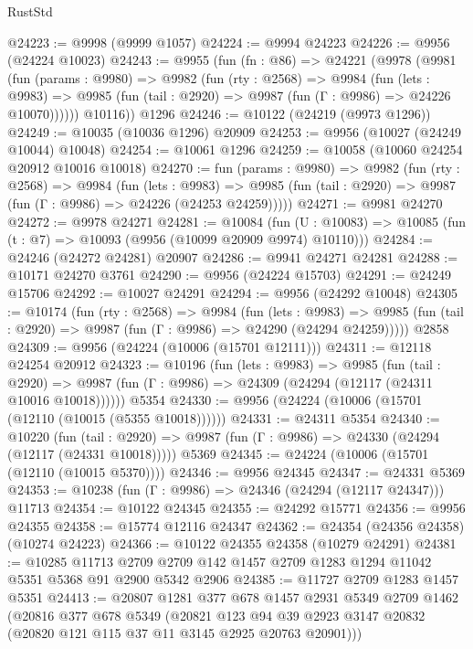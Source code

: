 \begin{lexlean}{RustStd}
\begin{coremodule}
@24223 := @9998 (@9999 @1057)
@24224 := @9994 @24223
@24226 := @9956 (@24224 @10023)
@24243 := @9955
    (fun (fn : @86) =>
    @24221
      (@9978
        (@9981
          (fun (params : @9980) =>
          @9982
            (fun (rty : @2568) =>
            @9984
              (fun (lets : @9983) =>
              @9985 (fun (tail : @2920) => @9987 (fun (Γ : @9986) => @24226 @10070))))))
        @10116))
    @1296
@24246 := @10122 (@24219 (@9973 @1296))
@24249 := @10035 (@10036 @1296) @20909
@24253 := @9956 (@10027 (@24249 @10044) @10048)
@24254 := @10061 @1296
@24259 := @10058 (@10060 @24254 @20912 @10016 @10018)
@24270 := fun (params : @9980) =>
  @9982
    (fun (rty : @2568) =>
    @9984
      (fun (lets : @9983) =>
      @9985 (fun (tail : @2920) => @9987 (fun (Γ : @9986) => @24226 (@24253 @24259)))))
@24271 := @9981 @24270
@24272 := @9978 @24271
@24281 := @10084
    (fun (U : @10083) => @10085 (fun (t : @7) => @10093 (@9956 (@10099 @20909 @9974) @10110)))
@24284 := @24246 (@24272 @24281) @20907
@24286 := @9941 @24271 @24281
@24288 := @10171 @24270 @3761
@24290 := @9956 (@24224 @15703)
@24291 := @24249 @15706
@24292 := @10027 @24291
@24294 := @9956 (@24292 @10048)
@24305 := @10174
    (fun (rty : @2568) =>
    @9984
      (fun (lets : @9983) =>
      @9985 (fun (tail : @2920) => @9987 (fun (Γ : @9986) => @24290 (@24294 @24259)))))
    @2858
@24309 := @9956 (@24224 (@10006 (@15701 @12111)))
@24311 := @12118 @24254 @20912
@24323 := @10196
    (fun (lets : @9983) =>
    @9985
      (fun (tail : @2920) =>
      @9987 (fun (Γ : @9986) => @24309 (@24294 (@12117 (@24311 @10016 @10018))))))
    @5354
@24330 := @9956 (@24224 (@10006 (@15701 (@12110 (@10015 (@5355 @10018))))))
@24331 := @24311 @5354
@24340 := @10220
    (fun (tail : @2920) => @9987 (fun (Γ : @9986) => @24330 (@24294 (@12117 (@24331 @10018)))))
    @5369
@24345 := @24224 (@10006 (@15701 (@12110 (@10015 @5370))))
@24346 := @9956 @24345
@24347 := @24331 @5369
@24353 := @10238 (fun (Γ : @9986) => @24346 (@24294 (@12117 @24347))) @11713
@24354 := @10122 @24345
@24355 := @24292 @15771
@24356 := @9956 @24355
@24358 := @15774 @12116 @24347
@24362 := @24354 (@24356 @24358) (@10274 @24223)
@24366 := @10122 @24355 @24358 (@10279 @24291)
@24381 := @10285
    @11713
    @2709
    @2709
    @142
    @1457
    @2709
    @1283
    @1294
    @11042
    @5351
    @5368
    @91
    @2900
    @5342
    @2906
@24385 := @11727 @2709 @1283 @1457 @5351
@24413 := @20807
    @1281
    @377
    @678
    @1457
    @2931
    @5349
    @2709
    @1462
    (@20816
      @377
      @678
      @5349
      (@20821 @123 @94 @39 @2923 @3147 @20832 (@20820 @121 @115 @37 @11 @3145 @2925 @20763 @20901)))

\end{coremodule}
\end{lexlean}
